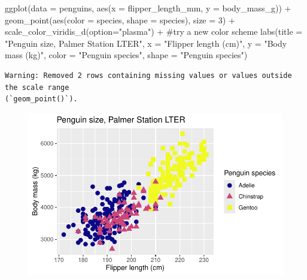 \documentclass[
  letterpaper,
  DIV=11,
  numbers=noendperiod]{scrreprt}
\newenvironment{Shaded}{\begin{snugshade}}{\end{snugshade}}
\newcommand{\AttributeTok}[1]{\textcolor[rgb]{0.40,0.45,0.13}{#1}}
\newcommand{\CommentTok}[1]{\textcolor[rgb]{0.37,0.37,0.37}{#1}}
\newcommand{\DecValTok}[1]{\textcolor[rgb]{0.68,0.00,0.00}{#1}}
\newcommand{\FunctionTok}[1]{\textcolor[rgb]{0.28,0.35,0.67}{#1}}
\newcommand{\NormalTok}[1]{\textcolor[rgb]{0.00,0.23,0.31}{#1}}
\newcommand{\SpecialCharTok}[1]{\textcolor[rgb]{0.37,0.37,0.37}{#1}}
\newcommand{\StringTok}[1]{\textcolor[rgb]{0.13,0.47,0.30}{#1}}
\begin{document}
\begin{Shaded}
\begin{Highlighting}[]
\FunctionTok{ggplot}\NormalTok{(}\AttributeTok{data =}\NormalTok{ penguins, }\FunctionTok{aes}\NormalTok{(}\AttributeTok{x =}\NormalTok{ flipper\_length\_mm, }\AttributeTok{y =}\NormalTok{ body\_mass\_g)) }\SpecialCharTok{+}
  \FunctionTok{geom\_point}\NormalTok{(}\FunctionTok{aes}\NormalTok{(}\AttributeTok{color =}\NormalTok{ species, }\AttributeTok{shape =}\NormalTok{ species), }\AttributeTok{size =} \DecValTok{3}\NormalTok{) }\SpecialCharTok{+}
  \FunctionTok{scale\_color\_viridis\_d}\NormalTok{(}\AttributeTok{option=}\StringTok{"plasma"}\NormalTok{) }\SpecialCharTok{+} \CommentTok{\#try a new color scheme}
  \FunctionTok{labs}\NormalTok{(}\AttributeTok{title =} \StringTok{"Penguin size, Palmer Station LTER"}\NormalTok{,}
       \AttributeTok{x =} \StringTok{"Flipper length (cm)"}\NormalTok{,}
       \AttributeTok{y =} \StringTok{"Body mass (kg)"}\NormalTok{,}
       \AttributeTok{color =} \StringTok{"Penguin species"}\NormalTok{,}
       \AttributeTok{shape =} \StringTok{"Penguin species"}\NormalTok{)}
\end{Highlighting}
\end{Shaded}

\begin{verbatim}
Warning: Removed 2 rows containing missing values or values outside the scale range
(`geom_point()`).
\end{verbatim}

\begin{figure}[H]

{\centering \includegraphics{scripts/02_dataViz/class4_files/figure-pdf/viridis-2.pdf}

}

\end{figure}
\end{document}
